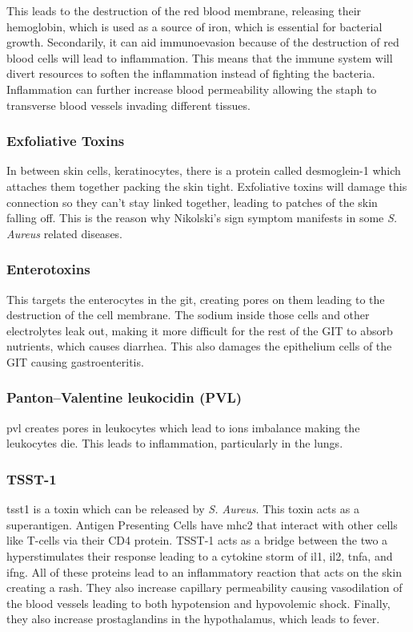 This leads to the destruction of the red blood membrane, releasing their hemoglobin, which is used as a source of iron, which is essential for bacterial growth. Secondarily, it can aid immunoevasion because of the destruction of red blood cells will lead to inflammation. This means that the immune system will divert resources to soften the inflammation instead of fighting the bacteria. Inflammation can further increase blood permeability allowing the \gls{staph} to transverse blood vessels invading different tissues.

\subsubsection{Exfoliative Toxins}

In between skin cells, keratinocytes, there is a protein called desmoglein-1 which attaches them together packing the skin tight. Exfoliative toxins will damage this connection so they can't stay linked together, leading to patches of the skin falling off. This is the reason why Nikolski's sign symptom manifests in some \textit{S. Aureus} related diseases.

\subsubsection{Enterotoxins}

This targets the enterocytes in the \gls{git}, creating pores on them leading to the destruction of the cell membrane. The sodium inside those cells and other electrolytes leak out, making it more difficult for the rest of the GIT to absorb nutrients, which causes diarrhea. This also damages the epithelium cells of the GIT causing gastroenteritis.

\subsubsection{Panton–Valentine leukocidin (PVL)}
\label{staphPVL}

\gls{pvl} creates pores in leukocytes which lead to ions imbalance making the leukocytes die. This leads to inflammation, particularly in the lungs.

\subsubsection{TSST-1}
\label{staphTSST1}

\gls{tsst1} is a toxin which can be released by \textit{S. Aureus}. This toxin acts as a superantigen. Antigen Presenting Cells have \gls{mhc2} that interact with other cells like T-cells via their CD4 protein. TSST-1 acts as a bridge between the two a hyperstimulates their response leading to a cytokine storm of \gls{il1}, \gls{il2}, \gls{tnfa}, and \gls{ifng}. All of these proteins lead to an inflammatory reaction that acts on the skin creating a rash. They also increase capillary permeability causing vasodilation of the blood vessels leading to both hypotension and hypovolemic shock. Finally, they also increase prostaglandins in the hypothalamus, which leads to fever.

